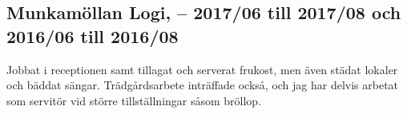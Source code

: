      \subsection*{\textcolor{colorTitelErfarenhet}{Munkamöllan Logi,  – 2017/06 till 2017/08 och 2016/06 till 2016/08}}
      Jobbat i receptionen samt tillagat och serverat frukost, men även städat lokaler och bäddat sängar. Trädgårdsarbete inträffade också, och jag har delvis arbetat som servitör vid större tillställningar såsom bröllop.

      \vspace{15pt} %